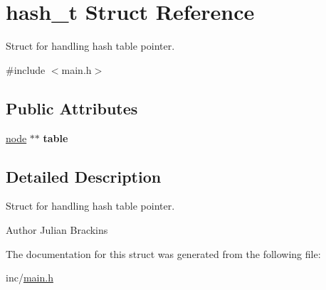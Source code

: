 \hypertarget{structhash__t}{\section{hash\-\_\-t Struct Reference}
\label{structhash__t}
}


Struct for handling hash table pointer.  




{\ttfamily \#include $<$main.\-h$>$}

\subsection*{Public Attributes}
\begin{DoxyCompactItemize}
\item 
\hypertarget{structhash__t_add0af7c857ebb1dfdfd0913bc4acfe41}{\hyperlink{structnode}{node} $\ast$$\ast$ {\bfseries table}}\label{structhash__t_add0af7c857ebb1dfdfd0913bc4acfe41}

\end{DoxyCompactItemize}


\subsection{Detailed Description}
Struct for handling hash table pointer. 

\begin{DoxyAuthor}{Author}
Julian Brackins 
\end{DoxyAuthor}


The documentation for this struct was generated from the following file\-:\begin{DoxyCompactItemize}
\item 
inc/\hyperlink{main_8h}{main.\-h}\end{DoxyCompactItemize}
